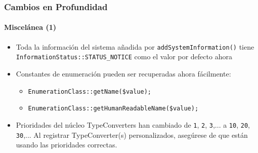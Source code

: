 \begin{frame}[fragile]
	\frametitle{Cambios en Profundidad}
	\framesubtitle{Miscelánea (1)}


	\begin{itemize}
		\item Toda la información del sistema añadida por \texttt{addSystemInformation()} tiene
			\texttt{InformationStatus::STATUS\_NOTICE} como el valor por defecto ahora
		\item Constantes de enumeración pueden ser recuperadas ahora fácilmente:

			\begin{itemize}
				\item \texttt{EnumerationClass::getName(\$value);}
				\item \texttt{EnumerationClass::getHumanReadableName(\$value);}
			\end{itemize}

		\item Prioridades del núcleo TypeConverters han cambiado de\newline
			\texttt{1}, \texttt{2}, \texttt{3},... a \texttt{10}, \texttt{20}, \texttt{30},...
			Al registrar TypeConverter(s) personalizados, asegúrese de que están usando las prioridades correctas.

	\end{itemize}

\end{frame}







